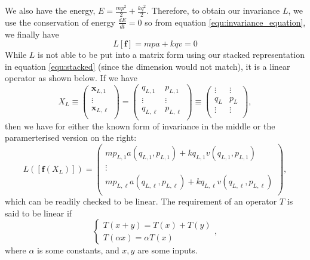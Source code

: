 \documentclass{statsmsc}
\begin{document}
We also have the energy, $E=\frac{mp^2}{2}+\frac{kq^2}{2}.$
Therefore, to obtain our invariance $L$, we use the conservation of energy $\frac{dE}{dt}=0$ so from equation \ref{equ:invariance_equation}, we finally have $$L[\mathbf{f}]=mpa+kqv=0$$
While $L$ is not able to be put into a matrix form using our stacked representation in equation \ref{equ:stacked} (since the dimension would not match), it is a linear operator as shown below. 
If we have $$X_L\equiv\begin{pmatrix}
    \mathbf{x}_{L,1}\\
    \vdots\\
    \mathbf{x}_{L,\ell}\\
\end{pmatrix}=\begin{pmatrix}
    q_{L,1} & p_{L,1}\\
    \vdots & \vdots \\
    q_{L,\ell} & p_{L,\ell}\\
\end{pmatrix}\equiv\begin{pmatrix}
    \vdots & \vdots\\
    q_L & p_L\\
    \vdots & \vdots\\
\end{pmatrix},$$
then we have for either the known form of invariance in the middle or the paramerterised version on the right:
$$
L([\mathbf{f}(X_L)]) = \begin{pmatrix}
   mp_{L,1}a(q_{L,1},p_{L,1}) + kq_{L,1}v(q_{L,1},p_{L,1})\\ 
   \vdots \\
   mp_{L,\ell}a(q_{L,\ell},p_{L,\ell}) + kq_{L,\ell}v(q_{L,\ell},p_{L,\ell})\\ 
\end{pmatrix},
$$
which can be readily checked to be linear.
The requirement of an operator $T$ is said to be linear if 
$$
\begin{cases}
  T(x+y) = T(x)+T(y)\\
  T(\alpha x) = \alpha T(x)
\end{cases},
$$
where $\alpha$ is some constants, and $x, y$ are some inputs.
\end{document}
